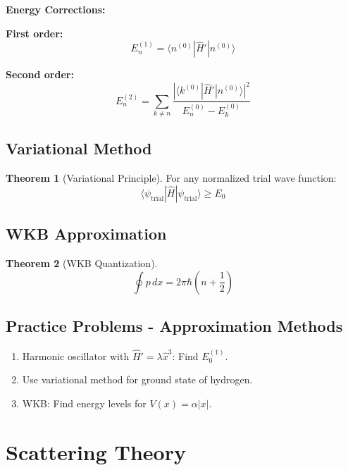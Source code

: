 \documentclass[12pt,a4paper]{article}
\theoremstyle{definition}
\newtheorem{theorem}{Theorem}[section]
\begin{document}
\begin{importantbox}
\textbf{Energy Corrections:}

\textbf{First order:}
\[
E_n^{(1)} = \langle n^{(0)}|\hat{H}'|n^{(0)}\rangle
\]

\textbf{Second order:}
\[
E_n^{(2)} = \sum_{k \neq n} \frac{|\langle k^{(0)}|\hat{H}'|n^{(0)}\rangle|^2}{E_n^{(0)} - E_k^{(0)}}
\]
\end{importantbox}

\subsection{Variational Method}

\begin{theorem}[Variational Principle]
For any normalized trial wave function:
\[
\langle\psi_{\text{trial}}|\hat{H}|\psi_{\text{trial}}\rangle \geq E_0
\]
\end{theorem}

\subsection{WKB Approximation}

\begin{theorem}[WKB Quantization]
\[
\oint p\,dx = 2\pi\hbar\left(n + \frac{1}{2}\right)
\]
\end{theorem}

\subsection{Practice Problems - Approximation Methods}

\begin{enumerate}
    \item Harmonic oscillator with $\hat{H}' = \lambda\hat{x}^3$: Find $E_0^{(1)}$.
    \item Use variational method for ground state of hydrogen.
    \item WKB: Find energy levels for $V(x) = \alpha|x|$.
\end{enumerate}

\newpage
\section{Scattering Theory}
\end{document}
